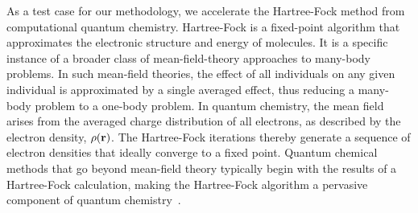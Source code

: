 \documentclass[twoside,11pt]{article}
\begin{document}

As a test case for our methodology, we accelerate the Hartree-Fock method from computational quantum chemistry. Hartree-Fock is a fixed-point algorithm that approximates the electronic structure and energy of molecules.  It is a specific instance of a broader class of mean-field-theory approaches to many-body problems. In such mean-field theories, the effect of all individuals on any given individual is approximated by a single averaged effect, thus reducing a many-body problem to a one-body problem. In quantum chemistry, the mean field arises from the averaged charge distribution of all electrons, as described by the electron density, $\rho({\bf r})$. The Hartree-Fock iterations thereby generate a sequence of electron densities that ideally converge to a fixed point. Quantum chemical methods that go beyond mean-field theory typically begin with the results of a Hartree-Fock calculation, making the Hartree-Fock algorithm a pervasive component of quantum chemistry~\cite{Some authoritative review of electronic structure theory}.

\end{document}
